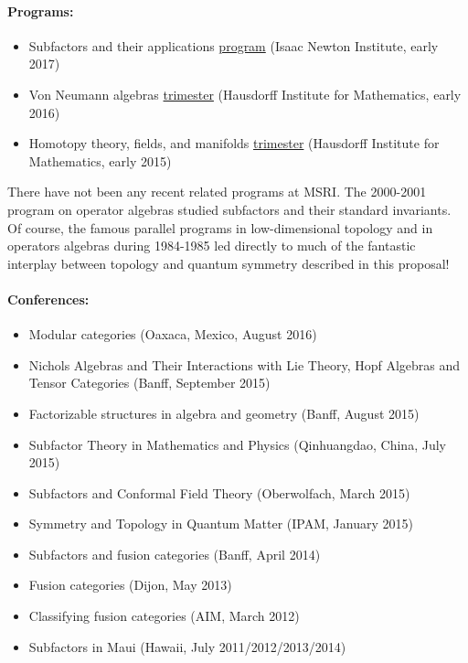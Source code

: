 \documentclass[11pt]{article}
\begin{document}
\paragraph{Programs:}
\begin{itemize}
  \setlength{\itemsep}{1pt}
  \setlength{\parskip}{0pt}
  \setlength{\parsep}{0pt}
\item Subfactors and their applications \href{https://www.newton.ac.uk/event/oas}{program} (Isaac Newton Institute, early 2017)
\item Von Neumann algebras \href{https://www.him.uni-bonn.de/programs/future-programs/future-trimester-programs/von-neumann-algebras-2016/description/}{trimester} (Hausdorff Institute for Mathematics, early 2016)
\item Homotopy theory, fields, and manifolds \href{https://www.him.uni-bonn.de/programs/past-programs/past-trimester-programs/homotopy-theory-2015/description/}{trimester} (Hausdorff Institute for Mathematics, early 2015)
\end{itemize}

There have not been any recent related programs at MSRI. The 2000-2001 program on operator algebras studied subfactors and their standard invariants. Of course, the famous parallel programs in low-dimensional topology and in operators algebras during 1984-1985 led directly to much of the fantastic interplay between topology and quantum symmetry described in this proposal!

\paragraph{Conferences:}
\begin{itemize}
  \setlength{\itemsep}{1pt}
  \setlength{\parskip}{0pt}
  \setlength{\parsep}{0pt}
\item Modular categories (Oaxaca, Mexico, August 2016)
\item Nichols Algebras and Their Interactions with Lie Theory, Hopf Algebras and Tensor Categories (Banff, September 2015)
\item Factorizable structures in algebra and geometry (Banff, August 2015)
\item Subfactor Theory in Mathematics and Physics (Qinhuangdao, China, July 2015)
\item Subfactors and Conformal Field Theory (Oberwolfach, March 2015)
\item Symmetry and Topology in Quantum Matter (IPAM, January 2015)
\item Subfactors and fusion categories (Banff, April 2014)
\item Fusion categories (Dijon, May 2013)
\item Classifying fusion categories (AIM, March 2012)
\item Subfactors in Maui (Hawaii, July 2011/2012/2013/2014)
\end{itemize}
\end{document}
